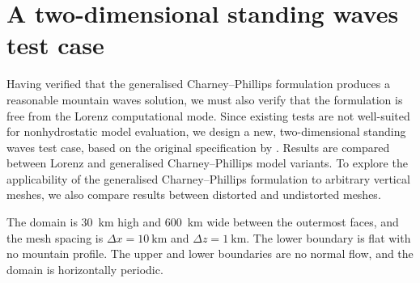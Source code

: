 \section{A two-dimensional standing waves test case}
\label{sec:cp:arakawaKonor}

Having verified that the generalised Charney--Phillips formulation produces a reasonable mountain waves solution, we must also verify that the formulation is free from the Lorenz computational mode.
Since existing tests are not well-suited for nonhydrostatic model evaluation, we design a new, two-dimensional standing waves test case, based on the original specification by \citet{arakawa-konor1996}.
Results are compared between Lorenz and generalised Charney--Phillips model variants.
To explore the applicability of the generalised Charney--Phillips formulation to arbitrary vertical meshes, we also compare results between distorted and undistorted meshes.

The domain is \SI{30}{\kilo\meter} high and \SI{600}{\kilo\meter} wide between the outermost faces, and the mesh spacing is $\Delta x = \SI{10}{\kilo\meter}$ and $\Delta z = \SI{1}{\kilo\meter}$.  The lower boundary is flat with no mountain profile.
The upper and lower boundaries are no normal flow, and the domain is horizontally periodic.

